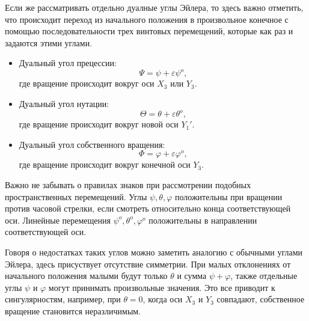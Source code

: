 Если же рассматривать отдельно дуалные углы Эйлера, то здесь важно отметить, что происходит переход из начального положения в произвольное конечное с помощью последовательности трех винтовых перемещений, которые как раз и задаются этими углами.
\begin{itemize}
    \item Дуальный угол прецессии:
        \begin{equation*}
            \Psi = \psi + \varepsilon \psi^o,
        \end{equation*}
        где вращение происходит вокруг оси $X_3$ или $Y_3$.
    \item Дуальный угол нутации:
        \begin{equation*}
            \Theta = \theta + \varepsilon \theta^o,
        \end{equation*}
        где вращение происходит вокруг новой оси $Y_1'$.
    \item Дуальный угол собственного вращения:
        \begin{equation*}
            \Phi = \varphi + \varepsilon \varphi^o,
        \end{equation*}
        где вращение происходит вокруг конечной оси $Y_3$.
\end{itemize}

Важно не забывать о правилах знаков при рассмотрении подобных пространственных перемещений. Углы $\psi, \theta, \varphi$ положительны при вращении против часовой стрелки, если смотреть относительно конца соответствующей оси. Линейные перемещения  $\psi^o, \theta^o, \varphi^o$ положительны в направлении соответствующей оси.

Говоря о недостатках таких углов можно заметить аналогию с обычными углами Эйлера, здесь  присуствует отсутствие симметрии. При малых отклонениях от начального положения малыми будут только $\theta$ и сумма $\psi + \varphi$, также отдельные углы $\psi$ и $\varphi$ могут принимать произвольные значения. Это все приводит к сингулярностям, например, при $\theta=0$, когда оси $X_3$ и $Y_3$ совпадают, собственное вращение становится неразличимым.

